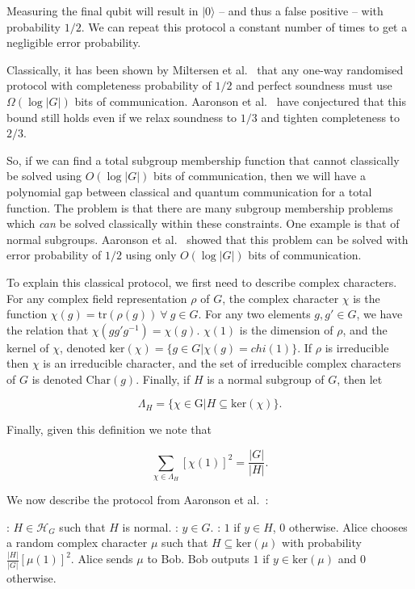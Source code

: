 \documentclass[a4paper]{article}
\begin{document}
        Measuring the final qubit will result in $|0\rangle$ -- and thus a false positive -- with probability $1/2$. We can repeat this protocol a constant number of times to get a negligible error probability.

        Classically, it has been shown by Miltersen et al.~\cite{Miltersen199837} that any one-way randomised protocol with completeness probability of $1/2$ and perfect soundness must use $\Omega(\log|G|)$ bits of communication. Aaronson et al.~\cite{0902.3175} have conjectured that this bound still holds even if we relax soundness to $1/3$ and tighten completeness to $2/3$.

        So, if we can find a total subgroup membership function that cannot classically be solved using $O(\log |G|)$ bits of communication, then we will have a polynomial gap between classical and quantum communication for a total function. The problem is that there are many subgroup membership problems which {\em can} be solved classically within these constraints. One example is that of normal subgroups. Aaronson et al.~\cite{0902.3175} showed that this problem can be solved with error probability of $1/2$ using only $O(\log |G|)$ bits of communication.

        To explain this classical protocol, we first need to describe complex characters. For any complex field representation $\rho$ of $G$, the complex character $\chi$ is the function $\chi(g) = \textrm{tr}(\rho(g))~\forall~g\in G$. For any two elements $g, g' \in G$, we have the relation that $\chi(gg'g^{-1}) = \chi(g)$. $\chi(1)$ is the dimension of $\rho$, and the kernel of $\chi$, denoted $\textrm{ker}(\chi) = \{g \in G|\chi(g) = chi(1)\}$. If $\rho$ is irreducible then $\chi$ is an irreducible character, and the set of irreducible complex characters of $G$ is denoted $\textrm{Char}(g)$. Finally, if $H$ is a normal subgroup of $G$, then let

        $$\Lambda_H = \{\chi \in \textrm{G}|H\subseteq \textrm{ker}(\chi)\}.$$

        Finally, given this definition we note that

        $$\sum_{\chi \in \Lambda_H}[\chi(1)]^2 = \frac{|G|}{|H|}.$$

        We now describe the protocol from Aaronson et al.~\cite{0902.3175}:

        \begin{codebox}
            \zi {}: $H \in \mathscr{H}_G$ such that $H$ is normal.
            \zi {}: $y \in G$.
            \zi {}: $1$ if $y \in H$, $0$ otherwise.
            \li Alice chooses a random complex character $\mu$ such that $H \subseteq \textrm{ker}(\mu)$ with probability $\frac{|H|}{|G|}[\mu(1)]^2$.
            \li Alice sends $\mu$ to Bob.
            \li Bob outputs $1$ if $y \in \textrm{ker}(\mu)$ and $0$ otherwise.
        \end{codebox}
\end{document}
